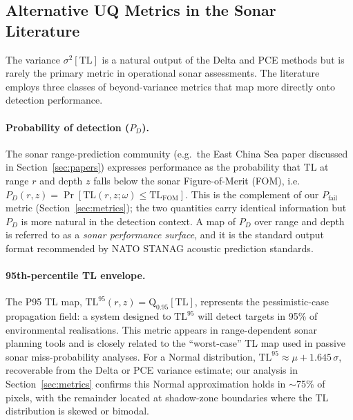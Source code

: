 \documentclass[11pt,a4paper]{article}
\newcommand{\TL}{\mathrm{TL}}
\begin{document}
\subsection{Alternative UQ Metrics in the Sonar Literature}
\label{sec:metrics_lit}

The variance $\sigma^2[\TL]$ is a natural output of the Delta and PCE methods but
is rarely the primary metric in operational sonar assessments.
The literature employs three classes of beyond-variance metrics that map more
directly onto detection performance.

\paragraph{Probability of detection ($P_D$).}
The sonar range-prediction community (e.g.\ the East China Sea paper discussed in
Section~\ref{sec:papers}) expresses performance as the probability that TL at range
$r$ and depth $z$ falls below the sonar Figure-of-Merit (FOM), i.e.\
$P_D(r,z) = \Pr[\TL(r,z;\omega) \leq \TL_\text{FOM}]$.
This is the complement of our $P_\mathrm{fail}$ metric (Section~\ref{sec:metrics});
the two quantities carry identical information but $P_D$ is more natural in the
detection context.
A map of $P_D$ over range and depth is referred to as a \emph{sonar performance
surface}, and it is the standard output format recommended by NATO STANAG acoustic
prediction standards.

\paragraph{95th-percentile TL envelope.}
The P95 TL map, $\TL^{95}(r,z) = \mathrm{Q}_{0.95}[\TL]$, represents the
pessimistic-case propagation field: a system designed to $\TL^{95}$ will detect
targets in 95\% of environmental realisations.
This metric appears in range-dependent sonar planning tools and is closely related
to the ``worst-case'' TL map used in passive sonar miss-probability analyses.
For a Normal distribution, $\TL^{95} \approx \mu + 1.645\,\sigma$, recoverable
from the Delta or PCE variance estimate; our analysis in
Section~\ref{sec:metrics} confirms this Normal approximation holds in $\sim$75\%
of pixels, with the remainder located at shadow-zone boundaries where the TL
distribution is skewed or bimodal.
\end{document}
